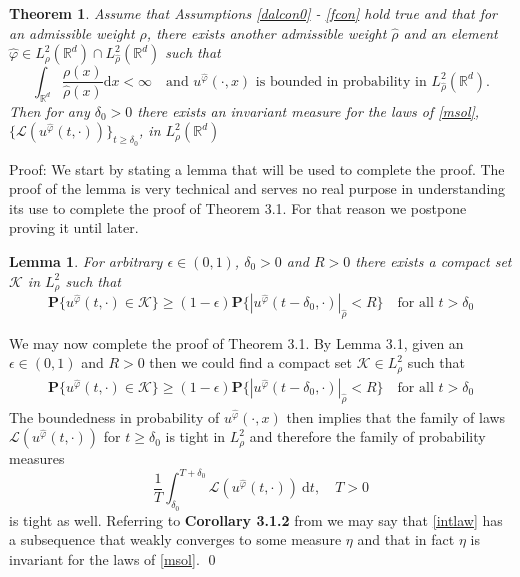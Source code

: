 \documentclass{article}
\newtheorem{theorem}{Theorem}[section]
\newtheorem{lemma}{Lemma}[section]
\numberwithin{equation}{section}
\newcommand{\R}{\mathbb{R}}
\newcommand{\ud}{\ensuremath{\mathrm{d}}}
\begin{document}
\begin{theorem} \textit{Assume that Assumptions \ref{dalcon0} - \ref{fcon} hold true and that for an admissible weight $\rho$, there exists another admissible weight $\hat\rho$ and an element $\hat{\varphi} \in L^2_\rho(\R^d) \cap L^2_{\hat\rho}(\R^d)$ such that 
	$$ \int_{\R^d}\dfrac{\rho(x)}{\hat\rho(x)}\ud x < \infty \quad \text{and $u^{\hat\varphi}(\cdot,x)$ is bounded in probability in $L^2_{\hat\rho}(\R^d)$.} $$ 
Then for any $\delta_0 >0$ there exists an invariant measure for the laws of \eqref{msol}, $\{\mathscr L (u^{\hat\varphi}(t,\cdot))\}_{t \ge \delta_0}$,  in $L^2_\rho(\R^d)$} 
\end{theorem}

Proof: We start by stating a lemma that will be used to complete the proof. The proof of the lemma is very technical and serves no real purpose in understanding its use to complete the proof of Theorem 3.1. For that reason we postpone proving it until later. 
 
\begin{lemma} \textit{For arbitrary $\epsilon \in (0,1)$, $\delta_0 >0$ and $R>0$ there exists a compact set $\mathscr K$ in $L^2_{ \rho}$ such that} 
 \begin{equation}
 	\textbf{P}\{u^{\hat{\varphi}}(t,\cdot) \in \mathscr K \} \ge (1-\epsilon)\textbf{P}\{|u^{ \hat{\varphi}}(t-\delta_0,\cdot)|_{\hat \rho} < R\} \quad \text{for all $t>\delta_0$} \label{cpt}
 \end{equation}
 \end{lemma}
 
 We may now complete the proof of Theorem 3.1. By Lemma 3.1, given an $\epsilon \in (0,1)$ and $R>0$ then we could find a compact set $\mathscr K \in L^2_{\rho}$ such that  
 \begin{align*}
 \textbf{P}\{u^{\hat \varphi}(t,\cdot) \in \mathscr K \} \ge (1-\epsilon)\textbf{P}\{|u^{\hat \varphi}(t-\delta_0,\cdot)|_{\hat \rho} < R\} \quad \text{for all $t>\delta_0$} 
 \end{align*}
 The boundedness in probability of $u^{\hat \varphi}(\cdot,x)$ then implies that the family of laws $\mathscr L(u^{\hat \varphi}(t,\cdot))$ for $t \ge \delta_0$ is  tight in $L^2_{\rho}$ and therefore the family of probability measures 
 \begin{equation}
 \dfrac{1}{T}\int_{\delta_0}^{T+\delta_0} \mathscr L(u^{\hat \varphi}(t,\cdot))\: \ud t, \quad T>0 \label{intlaw}
 \end{equation}
 is tight as well. Referring to \textbf{Corollary 3.1.2} from  \cite{DZ96} we may say that \eqref{intlaw} has a subsequence that weakly converges to some measure $\eta$ and that in fact $\eta$ is invariant for the laws of \eqref{msol}. \qed \\
 
\end{document}
